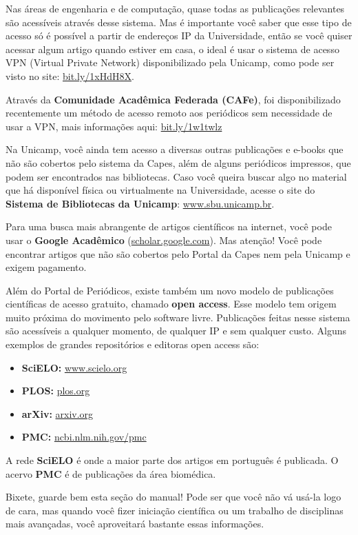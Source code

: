 Nas áreas de engenharia e de computação, quase todas as publicações relevantes
são acessíveis através desse sistema. Mas é importante você saber que esse tipo
de acesso só é possível a partir de endereços IP da Universidade, então se você
quiser acessar algum artigo quando estiver em casa, o ideal é usar o sistema de
acesso VPN (Virtual Private Network) disponibilizado pela Unicamp, como pode
ser visto no site: \url{bit.ly/1xHdH8X}.

Através da \textbf{Comunidade Acadêmica Federada (CAFe)}, foi disponibilizado
recentemente um método de acesso remoto aos periódicos sem necessidade de usar
a VPN, mais informações aqui: \url{bit.ly/1w1twlz}

Na Unicamp, você ainda tem acesso a diversas outras publicações e e-books que
não são cobertos pelo sistema da Capes, além de alguns periódicos impressos,
que podem ser encontrados nas bibliotecas. Caso você queira buscar algo no
material que há disponível física ou virtualmente na Universidade, acesse o
site do \textbf{Sistema de Bibliotecas da Unicamp}: \url{www.sbu.unicamp.br}.

Para uma busca mais abrangente de artigos científicos na internet, você pode
usar o \textbf{Google Acadêmico} (\url{scholar.google.com}). Mas atenção! Você
pode encontrar artigos que não são cobertos pelo Portal da Capes nem pela
Unicamp e exigem pagamento.

Além do Portal de Periódicos, existe também um novo modelo de publicações
científicas de acesso gratuito, chamado \textbf{open access}. Esse modelo tem
origem muito próxima do movimento pelo software livre. Publicações feitas nesse
sistema são acessíveis a qualquer momento, de qualquer IP e sem qualquer custo.
Alguns exemplos de grandes repositórios e editoras open access são:

\begin{itemize}
\item \textbf{SciELO:} \url{www.scielo.org}
\item \textbf{PLOS:} \url{plos.org}
\item \textbf{arXiv:} \url{arxiv.org}
\item \textbf{PMC:} \url{ncbi.nlm.nih.gov/pmc}
\end{itemize}

A rede \textbf{SciELO} é onde a maior parte dos artigos em português é
publicada. O acervo \textbf{PMC} é de publicações da área biomédica.

Bixete, guarde bem esta seção do manual! Pode ser que você não vá usá-la logo
de cara, mas quando você fizer iniciação científica ou um trabalho de
disciplinas mais avançadas, você aproveitará bastante essas informações.
